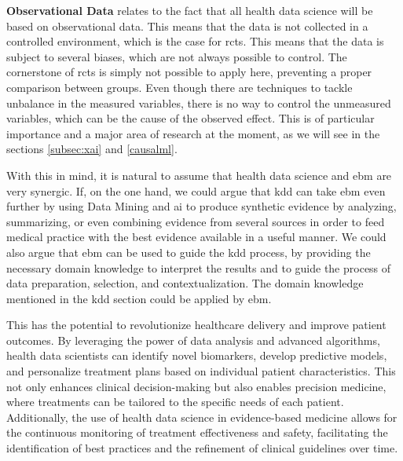 \textbf{Observational Data} relates to the fact that all health data science will be based on observational data. This means that the data is not collected in a controlled environment, which is the case for \acp{rct}. This means that the data is subject to several biases, which are not always possible to control. The cornerstone of \acp{rct} is simply not possible to apply here, preventing a proper comparison between groups. Even though there are techniques to tackle unbalance in the measured variables, there is no way to control the unmeasured variables, which can be the cause of the observed effect. This is of particular importance and a major area of research at the moment, as we will see in the sections \ref{subsec:xai} and \ref{causalml}.

With this in mind, it is natural to assume that health data science and \ac{ebm} are very synergic. If, on the one hand, we could argue that \ac{kdd} can take \ac{ebm} even further by using Data Mining and \ac{ai} to produce synthetic evidence by analyzing, summarizing, or even combining evidence from several sources in order to feed medical practice with the best evidence available in a useful manner. We could also argue that \ac{ebm} can be used to guide the \ac{kdd} process, by providing the necessary domain knowledge to interpret the results and to guide the process of data preparation, selection, and contextualization. The domain knowledge mentioned in the \ac{kdd} section could be applied by \ac{ebm}.

This has the potential to revolutionize healthcare delivery and improve patient outcomes. By leveraging the power of data analysis and advanced algorithms, health data scientists can identify novel biomarkers, develop predictive models, and personalize treatment plans based on individual patient characteristics. This not only enhances clinical decision-making but also enables precision medicine, where treatments can be tailored to the specific needs of each patient. Additionally, the use of health data science in evidence-based medicine allows for the continuous monitoring of treatment effectiveness and safety, facilitating the identification of best practices and the refinement of clinical guidelines over time.

